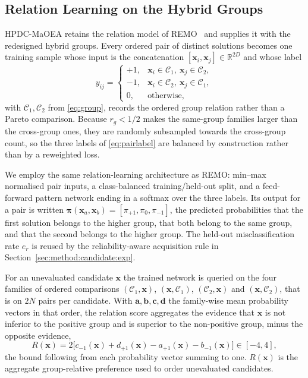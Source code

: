 \documentclass[final,5p,times,twocolumn]{elsarticle}
\newcommand{\vx}{\mathbf{x}}
\begin{document}
\subsection{Relation Learning on the Hybrid Groups}
\label{sec:method:relation}

HPDC-MaOEA retains the relation model of REMO~\cite{ref:remo} and supplies it
with the redesigned hybrid groups. Every ordered pair
of distinct solutions becomes one training sample whose input is the
concatenation $[\vx_i,\vx_j]\in\mathbb{R}^{2D}$ and whose label
\begin{equation}
y_{ij}=
\begin{cases}
+1, & \vx_i\in\mathcal{C}_1,\ \vx_j\in\mathcal{C}_2,\\
-1, & \vx_i\in\mathcal{C}_2,\ \vx_j\in\mathcal{C}_1,\\
0,  & \text{otherwise},
\end{cases}
\label{eq:pairlabel}
\end{equation}
with $\mathcal{C}_1,\mathcal{C}_2$ from \eqref{eq:group}, records the ordered
group relation rather than a Pareto comparison. Because $r_g<1/2$ makes the
same-group families larger than the cross-group ones, they are randomly
subsampled towards the cross-group count, so the three labels of
\eqref{eq:pairlabel} are balanced by construction rather than by a reweighted
loss.

We employ the same relation-learning architecture as REMO: min--max normalised
pair inputs, a class-balanced training/held-out split, and a feed-forward pattern
network ending in a softmax over the three labels.
Its output for a pair is written
$\bm{\pi}(\vx_a,\vx_b)=[\pi_{+1},\pi_0,\pi_{-1}]$, the predicted probabilities
that the first solution belongs to the higher group, that both belong to the
same group, and that the second belongs to the higher group. The held-out
misclassification rate $e_r$ is reused by the reliability-aware acquisition
rule in Section~\ref{sec:method:candidate:exp}.

For an unevaluated candidate $\vx$ the trained network is queried on the four
families of ordered comparisons $(\mathcal{C}_1,\vx)$, $(\vx,\mathcal{C}_1)$,
$(\mathcal{C}_2,\vx)$ and $(\vx,\mathcal{C}_2)$, that is on $2N$ pairs per
candidate. With $\mathbf{a},\mathbf{b},\mathbf{c},\mathbf{d}$ the family-wise
mean probability vectors in that order, the relation score aggregates the
evidence that $\vx$ is not inferior to the positive group and is superior to the
non-positive group, minus the opposite evidence,
\begin{equation}
R(\vx)=2\bigl[c_{-1}(\vx)+d_{+1}(\vx)-a_{+1}(\vx)-b_{-1}(\vx)\bigr]
\in[-4,4],
\label{eq:relscore}
\end{equation}
the bound following from each probability vector summing to one. $R(\vx)$ is the
aggregate group-relative preference used to order unevaluated candidates.
\end{document}
